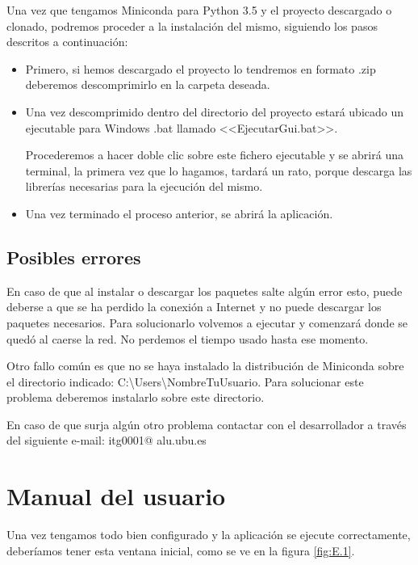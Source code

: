 Una vez que tengamos Miniconda para Python 3.5 y el proyecto descargado o clonado, podremos proceder a la instalación del mismo, siguiendo los pasos descritos a continuación:

\begin{itemize}
	\item Primero, si hemos descargado el proyecto lo tendremos en formato .zip deberemos descomprimirlo en la carpeta deseada.
	
	\item Una vez descomprimido dentro del directorio del proyecto estará ubicado un ejecutable para Windows .bat llamado <<\textrm{EjecutarGui.bat}>>.
	
	Procederemos a hacer doble clic sobre este fichero ejecutable y se abrirá una terminal, la primera vez que lo hagamos, tardará un rato, porque descarga las librerías necesarias para la ejecución del mismo.
	
	\item Una vez terminado el proceso anterior, se abrirá la aplicación.
\end{itemize}

\subsection{Posibles errores}
En caso de que al instalar o descargar los paquetes salte algún error esto, puede deberse a que se ha perdido la conexión a Internet y no puede descargar los paquetes necesarios.
Para solucionarlo volvemos a ejecutar y comenzará donde se quedó al caerse la red. No perdemos el tiempo usado hasta ese momento.

Otro fallo común es que no se haya instalado la distribución de Miniconda sobre el directorio indicado: \textrm{C:\textbackslash Users\textbackslash NombreTuUsuario}.
Para solucionar este problema deberemos instalarlo sobre este directorio.

En caso de que surja algún otro problema contactar con el desarrollador a través del siguiente e-mail: \textrm{itg0001\makeatletter @ alu.ubu.es}

\section{Manual del usuario}

Una vez tengamos todo bien configurado y la aplicación se ejecute correctamente, deberíamos tener esta ventana inicial, como se ve en la figura \ref{fig:E.1}.

